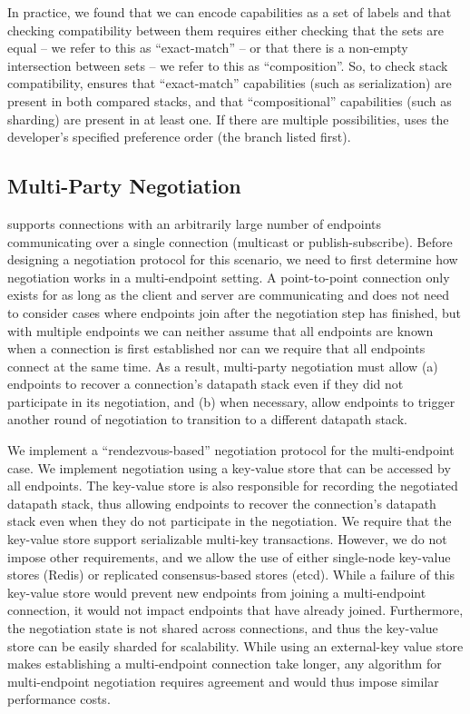 In practice, we found that we can encode \tunnel capabilities as a set of labels and that checking compatibility between them requires either checking that the sets are equal -- we refer to this as ``exact-match'' -- or that there is a non-empty intersection between sets -- we refer to this as ``composition''.
So, to check \tunnel stack compatibility, \name ensures that ``exact-match'' capabilities (such as serialization) are present in both compared stacks, and that ``compositional'' capabilities (such as sharding) are present in at least one.
If there are multiple possibilities, \name uses the developer's specified preference order (\ie the branch listed first).

\subsection{Multi-Party Negotiation}\label{s:multiparty}
\name supports connections with an arbitrarily large number of endpoints communicating over a single connection (\eg multicast or publish-subscribe). 
Before designing a negotiation protocol for this scenario,  we need to first determine how negotiation works in a multi-endpoint setting. 
A point-to-point connection only exists for as long as the client and server are communicating and does not need to consider cases where endpoints join after the negotiation step has finished,
but with multiple endpoints
we can neither assume that all endpoints are known when a connection is first established nor can we require that all endpoints connect at the same time. 
As a result, multi-party negotiation must allow (a) endpoints to recover a connection's datapath stack even if they did not participate in its negotiation, and (b) when necessary, allow endpoints to trigger another round of negotiation to transition to a different datapath stack. 

We implement a ``rendezvous-based'' negotiation protocol for the multi-endpoint case. We implement negotiation using a key-value store that can be accessed by all endpoints. The key-value store is also responsible for recording the negotiated datapath stack, thus allowing endpoints to recover the connection's datapath stack even when they do not participate in the negotiation. We require that the key-value store support serializable multi-key transactions. However, we do not impose other requirements, and we allow the use of either single-node key-value stores (\eg Redis) or replicated consensus-based stores (\eg etcd). 
While a failure of this key-value store would prevent new endpoints from joining a multi-endpoint connection, it would not impact endpoints that have already joined. 
Furthermore, the negotiation state is not shared across connections, and thus the key-value store can be easily sharded for scalability. While using an external-key value store makes establishing a multi-endpoint connection take longer, any algorithm for multi-endpoint negotiation requires agreement and would thus impose similar performance costs.

